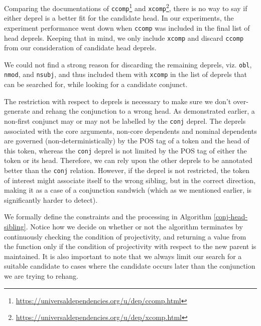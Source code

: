Comparing the documentations of \texttt{ccomp}\footnote{\url{https://universaldependencies.org/u/dep/ccomp.html}} and \texttt{xcomp}\footnote{\url{https://universaldependencies.org/u/dep/xcomp.html}}, there is no way to say if either deprel is a better fit for the candidate head. In our experiments, the experiment performance went down when \texttt{ccomp} was included in the final list of head deprels. Keeping that in mind, we only include \texttt{xcomp} and discard \texttt{ccomp} from our consideration of candidate head deprels.

We could not find a strong reason for discarding the remaining deprels, viz. \verb|obl|, \verb|nmod|, and \verb|nsubj|, and thus included them with \verb|xcomp| in the list of deprels that can be searched for, while looking for a candidate conjunct.

The restriction with respect to deprels is necessary to make sure we don't over-generate and rehang the conjunction to a wrong head. As demonstrated earlier, a non-first conjunct may or may not be labelled by the \texttt{conj} deprel. The deprels associated with the core arguments, non-core dependents and nominal dependents are governed (non-deterministically) by the POS tag of a token and the head of this token, whereas the \texttt{conj} deprel is not limited by the POS tag of either the token or its head. Therefore, we can rely upon the other deprels to be annotated better than the \texttt{conj} relation. However, if the deprel is not restricted, the token of interest might associate itself to the wrong sibling, but in the correct direction, making it as a case of a conjunction sandwich (which as we mentioned earlier, is significantly harder to detect).

We formally define the constraints and the processing in Algorithm \ref{conj-head-sibling}. Notice how we decide on whether or not the algorithm terminates by continuously checking the condition of projectivity, and returning a value from the function only if the condition of projectivity with respect to the new parent is maintained. It is also important to note that we always limit our search for a suitable candidate to cases where the candidate occurs later than the conjunction we are trying to rehang.

